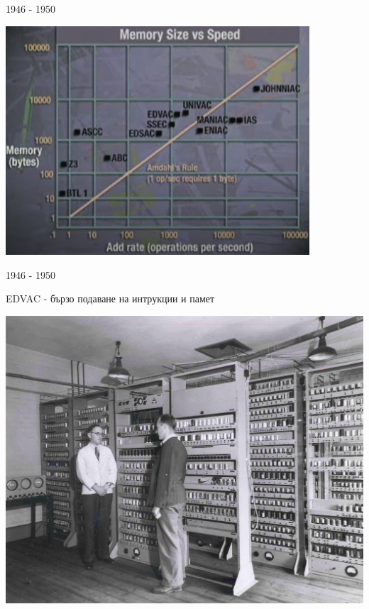 \documentclass{beamer}
\begin{document}
\begin{frame}{1946 - 1950}

  \includegraphics[width=0.85\textwidth]{memory-speed}

\end{frame}


\begin{frame}{1946 - 1950}

  EDVAC - бързо подаване на интрукции и памет

  \includegraphics[width=\textwidth]{edvac}

\end{frame}
\end{document}
